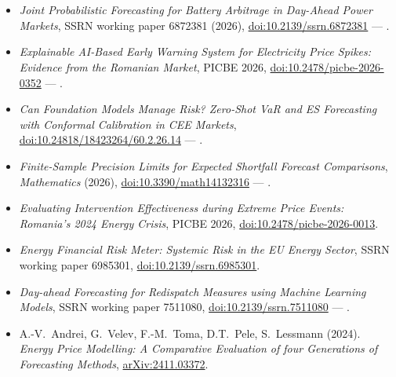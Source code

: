 \section{}
\small
\begin{itemize}
\item \emph{Joint Probabilistic Forecasting for Battery Arbitrage in Day-Ahead Power Markets}, SSRN working paper 6872381 (2026), \href{https://doi.org/10.2139/ssrn.6872381}{doi:10.2139/ssrn.6872381} --- .
\item \emph{Explainable AI-Based Early Warning System for Electricity Price Spikes: Evidence from the Romanian Market}, PICBE 2026, \href{https://doi.org/10.2478/picbe-2026-0352}{doi:10.2478/picbe-2026-0352} --- .
\item \emph{Can Foundation Models Manage Risk? Zero-Shot VaR and ES Forecasting with Conformal Calibration in CEE Markets}, \href{https://doi.org/10.24818/18423264/60.2.26.14}{doi:10.24818/18423264/60.2.26.14} --- .
\item \emph{Finite-Sample Precision Limits for Expected Shortfall Forecast Comparisons}, \emph{Mathematics} (2026), \href{https://doi.org/10.3390/math14132316}{doi:10.3390/math14132316} --- .
\item \emph{Evaluating Intervention Effectiveness during Extreme Price Events: Romania's 2024 Energy Crisis}, PICBE 2026, \href{https://doi.org/10.2478/picbe-2026-0013}{doi:10.2478/picbe-2026-0013}.
\item \emph{Energy Financial Risk Meter: Systemic Risk in the EU Energy Sector}, SSRN working paper 6985301, \href{https://doi.org/10.2139/ssrn.6985301}{doi:10.2139/ssrn.6985301}.
\item \emph{Day-ahead Forecasting for Redispatch Measures using Machine Learning Models}, SSRN working paper 7511080, \href{https://doi.org/10.2139/ssrn.7511080}{doi:10.2139/ssrn.7511080} --- .
\item A.-V.~Andrei, G.~Velev, F.-M.~Toma, D.T.~Pele, S.~Lessmann (2024). \emph{Energy Price Modelling: A Comparative Evaluation of four Generations of Forecasting Methods}, \href{https://arxiv.org/abs/2411.03372}{arXiv:2411.03372}.
\end{itemize}

